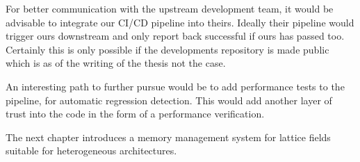 For better communication with the upstream \quda development team, it would be advisable to integrate our CI/CD pipeline into theirs.
Ideally their pipeline would trigger ours downstream and only report back successful if ours has passed too.
Certainly this is only possible if the \openqxd developments repository is made public which is as of the writing of the thesis not the case.

An interesting path to further pursue would be to add performance tests to the pipeline, for automatic regression detection.
This would add another layer of trust into the code in the form of a performance verification.

The next chapter introduces a memory management system for lattice fields suitable for heterogeneous architectures.

